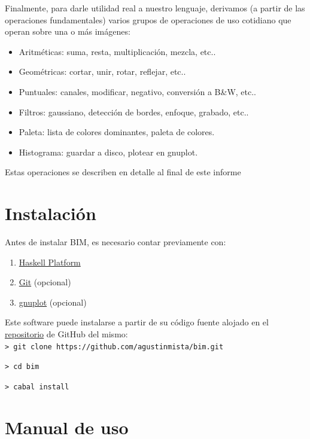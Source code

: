 \documentclass[a4paper, 11pt]{article} %
\begin{document}
\noindent Finalmente, para darle utilidad real a nuestro lenguaje, derivamos (a partir de las operaciones fundamentales) varios grupos de operaciones de uso cotidiano que operan sobre una o más imágenes:
	\begin{itemize}
		\item Aritméticas: suma, resta, multiplicación, mezcla, etc..
		\item Geométricas: cortar, unir, rotar, reflejar, etc..
		\item Puntuales: canales, modificar, negativo, conversión a B\&W, etc..
		\item Filtros: gaussiano, detección de bordes, enfoque, grabado, etc..
		\item Paleta: lista de colores dominantes, paleta de colores.
		\item Histograma: guardar a disco, plotear en gnuplot.
	\end{itemize}
	
	Estas operaciones se describen en detalle al final de este informe


\section*{Instalación}

	Antes de instalar BIM, es necesario contar previamente con:

	\begin{enumerate}
		\item \href{https://www.haskell.org/platform}{Haskell Platform}
		\item \href{https://git-scm.com}{Git} (opcional)
		\item \href{http://www.gnuplot.info}{gnuplot} (opcional)
	\end{enumerate}


	\noindent Este software puede instalarse a partir de su código fuente alojado en el \href{https://github.com/agustinmista/bim}{repositorio} de GitHub del mismo:\\
	

	\texttt{> git clone https://github.com/agustinmista/bim.git}
	
	\texttt{> cd bim}
	
	\texttt{> cabal install}
	

\section*{Manual de uso}
\end{document}
